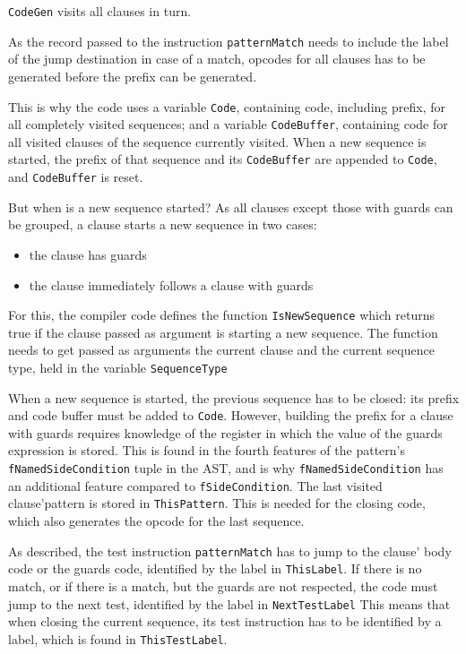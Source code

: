 \documentclass[a4paper]{memoir}
\begin{document}
\lstinline!CodeGen! visits all clauses in turn.

As the record passed to the instruction \lstinline!patternMatch! needs to
include the label of the jump destination in case of a match, opcodes for all
clauses has to be generated before the prefix can be generated.

This is why the code uses a variable \lstinline!Code!, containing code,
including prefix, for all completely visited sequences; and a variable
\lstinline!CodeBuffer!, containing code for all visited clauses of the sequence
currently visited. When a new sequence is started, the prefix of that sequence
and its \lstinline!CodeBuffer! are appended to \lstinline!Code!, and
\lstinline!CodeBuffer! is reset.

But when is a new sequence started? As all clauses except those with guards can
be grouped, a clause starts a new sequence in two cases:
\begin{itemize}
  \item the clause has guards
  \item the clause immediately follows a clause with guards
\end{itemize}

For this, the compiler code defines the function
\lstinline!IsNewSequence! which returns true if the clause passed as argument
is starting a new sequence. The function needs to get passed as arguments the current clause and
the current sequence type, held in the variable \lstinline!SequenceType!

\label{sec:codegen:fNamedSideCondition}When a new sequence is started, the previous sequence has to be closed: its
prefix and code buffer must be added to \lstinline!Code!. However, building the
prefix for a clause with guards requires knowledge of the register in which the
value of the guards expression is stored. This is found in the fourth features
of the pattern's \lstinline!fNamedSideCondition! tuple in the AST, and is why
 \lstinline!fNamedSideCondition! has an additional feature compared to
 \lstinline!fSideCondition!.
The last visited clause'pattern is stored in \lstinline!ThisPattern!. This is
needed for the closing code, which also generates the opcode for the last sequence.

As described, the test instruction \lstinline!patternMatch! has to jump to the
clause' body code or the guards code, identified by the label in
\lstinline!ThisLabel!. If there is no match, or if there is a match, but the
guards are not respected, the code must jump to the next test, identified by the
label in \lstinline!NextTestLabel!
This means that when closing the current sequence, its test instruction has to
be identified by a label, which is found in \lstinline!ThisTestLabel!.
\end{document}
